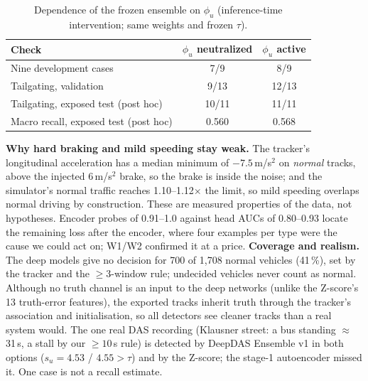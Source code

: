 \documentclass[10pt,a4paper,twocolumn]{article}
\newcommand{\EDIV}{DeepDAS Ensemble v1}\newcommand{\dev}{\textit{development}}\newcommand{\val}{\textit{validation}}\newcommand{\ft}{\textit{final test}}
\begin{document}
\begin{table}[h]\centering\footnotesize\setlength{\tabcolsep}{3pt}
\caption{Dependence of the frozen ensemble on $\phi_u$ (inference-time intervention; same weights and frozen $\tau$).}\label{tab:phi}
\begin{tabular}{@{}lcc@{}}\toprule
Check & $\phi_u$ neutralized & $\phi_u$ active \\\midrule
Nine development cases & 7/9 & 8/9 \\
Tailgating, validation & 9/13 & 12/13 \\
Tailgating, exposed test (post hoc) & 10/11 & 11/11 \\
Macro recall, exposed test (post hoc) & 0.560 & 0.568 \\\bottomrule
\end{tabular}\end{table}
\textbf{Why hard braking and mild speeding stay weak.} The tracker's longitudinal acceleration has a median minimum of $-7.5$\,m/s$^2$ on \emph{normal} tracks, above the injected 6\,m/s$^2$ brake, so the brake is inside the noise; and the simulator's normal traffic reaches 1.10--1.12$\times$ the limit, so mild speeding overlaps normal driving by construction. These are measured properties of the data, not hypotheses. Encoder probes of 0.91--1.0 against head AUCs of 0.80--0.93 locate the remaining loss after the encoder, where four examples per type were the cause we could act on; W1/W2 confirmed it at a price.
\textbf{Coverage and realism.} The deep models give no decision for 700 of 1{,}708 normal vehicles (41\,\%), set by the tracker and the $\ge3$-window rule; undecided vehicles never count as normal. Although no truth channel is an input to the deep networks (unlike the Z-score's 13 truth-error features), the exported tracks inherit truth through the tracker's association and initialisation, so all detectors see cleaner tracks than a real system would. The one real DAS recording (Klausner street: a bus standing $\approx$31\,s, a stall by our $\ge10$\,s rule) is detected by \EDIV{} in both options ($s_u=4.53$ / $4.55>\tau$) and by the Z-score; the stage-1 autoencoder missed it. One case is not a recall estimate.
\end{document}
